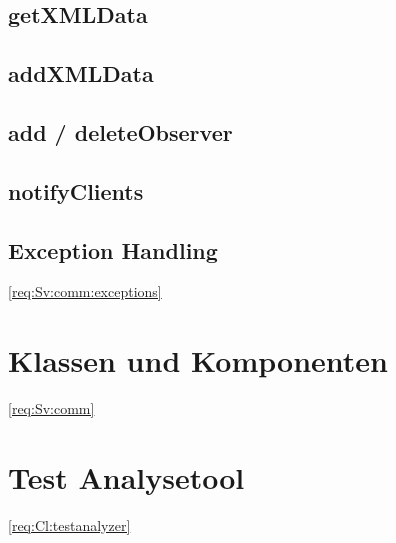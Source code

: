 \subsection {getXMLData}

\subsection {addXMLData}

\subsection {add / deleteObserver}

\subsection {notifyClients}

\subsection {Exception Handling}
\ref{req:Sv:comm:exceptions}
\section{Klassen und Komponenten}
\ref{req:Sv:comm}
\section{Test Analysetool} \ref{req:Cl:testanalyzer}
